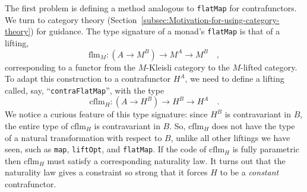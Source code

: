 The first problem is defining a method analogous to \lstinline!flatMap!
for contrafunctors. We turn to category theory (Section~\ref{subsec:Motivation-for-using-category-theory})
for guidance. The type signature of a monad\textsf{'}s \lstinline!flatMap!
is that of a lifting,
\[
\text{flm}_{M}:(A\rightarrow M^{B})\rightarrow M^{A}\rightarrow M^{B}\quad,
\]
corresponding to a functor from the $M$-Kleisli category to the $M$-lifted
category. To adapt this construction to a contrafunctor $H^{A}$,
we need to define a lifting called, say, \textsf{``}\lstinline!contraFlatMap!\textsf{''},
with the type 
\[
\text{cflm}_{H}:(A\rightarrow H^{B})\rightarrow H^{B}\rightarrow H^{A}\quad.
\]
We notice a curious feature of this type signature: since $H^{B}$
is contravariant in $B$, the entire type of $\text{cflm}_{H}$ is
contravariant in $B$. So, $\text{cflm}_{H}$ does not have the type
of a natural transformation with respect to $B$, unlike all other
liftings we have seen, such as \lstinline!map!, \lstinline!liftOpt!,
and \lstinline!flatMap!. If the code of $\text{cflm}_{H}$ is fully
parametric then $\text{cflm}_{H}$ must satisfy a corresponding naturality
law. It turns out that the naturality law gives a constraint so strong
that it forces $H$ to be a \emph{constant} contrafunctor.

